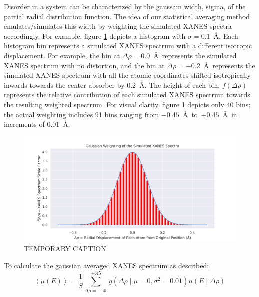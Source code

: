 Disorder in a system can be characterized by the gaussain width, sigma, of the partial radial distribution function. The idea of our statistical averaging method emulates/simulates this width by weighting the simulated XANES spectra accordingly. For example, figure \ref{fig:gaussian-weighting-hist} depicts a histogram with $ \sigma=0.1 $~\AA. Each histogram bin represents a simulated XANES spectrum with a different isotropic displacement. For example, the bin at $ \Delta\rho=0.0 $~\AA~represents the simulated XANES spectrum with no distortion, and the bin at $ \Delta\rho=-0.2 $~\AA~represents the simulated XANES spectrum with all the atomic coordinates shifted isotropically inwards towards the center absorber by $ 0.2 $~\AA. The height of each bin, $ f(\Delta\rho) $ represents the relative contribution of each simulated XANES spectrum towards the resulting weighted spectrum. For visual clarity, figure \ref{fig:gaussian-weighting-hist} depicts only 40 bins; the actual weighting includes 91 bins ranging from $ -0.45 $~\AA~to~$ +0.45 $~\AA~in increments of $ 0.01 $~\AA. 

\begin{figure}[!htb]
	\centering
	\includegraphics[width=\linewidth]{Chapters/Figures/gaussian-weighting-hist.png}
	\caption[Simulated Spectrum Gaussian Weighting]{TEMPORARY CAPTION}
	\label{fig:gaussian-weighting-hist}
\end{figure}

To calculate the gaussian averaged XANES spectrum as described:
\begin{equation}
	\label{eqn:gaussian-averaging}
	\left\langle \mu(E) \right\rangle  = \frac{1}{S} \sum_{\Delta\rho=-.45}^{+.45} g\left(\Delta \rho \mid \mu=0, \sigma^2=0.01\right) \mu(E \mid \Delta\rho)
\end{equation}

